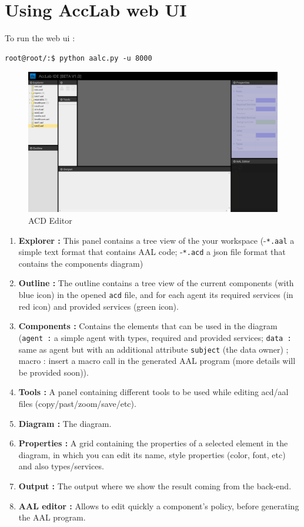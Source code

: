 \section{Using AccLab web UI}
To run the web ui :

{
\lstset{style=shell}
\begin{lstlisting}
root@root/:$ python aalc.py -u 8000
\end{lstlisting}
}


\begin{figure}[!ht]
      \center
      \includegraphics[width=15cm,angle=0]{assets/gui/interface0.png}
      \caption{ACD Editor}
\end{figure}

\begin{enumerate}
    \item \textbf{Explorer :} This panel contains a tree view of the your workspace (-\texttt{*.aal} a
    simple text format that contains AAL code; -\texttt{*.acd} a json file format that contains the components diagram)
    \item \textbf{Outline :} The outline contains a tree view of the current components (with blue icon) in the
    opened \texttt{acd} file, and for each agent its required services (in red icon) and provided services (green icon).
    \item \textbf{Components :} Contains the elements that can be used in the diagram (\texttt{agent :} a simple agent
     with types, required and provided services; \texttt{data :} same as agent but with an additional attribute \texttt{subject} (the data owner) ; macro : insert a macro call in the generated AAL program (more details will be provided soon)).
    \item \textbf{Tools :} A panel containing different tools to be used while editing acd/aal files (copy/past/zoom/save/etc).
    \item \textbf{Diagram :} The diagram.
    \item \textbf{Properties :} A grid containing the properties of a selected element in the diagram, in which you
    can edit its name, style properties (color, font, etc) and also types/services.
    \item \textbf{Output :} The output where we show the result coming from the back-end.
    \item \textbf{AAL editor :} Allows to edit quickly a component's policy, before generating the AAL program.
\end{enumerate}


